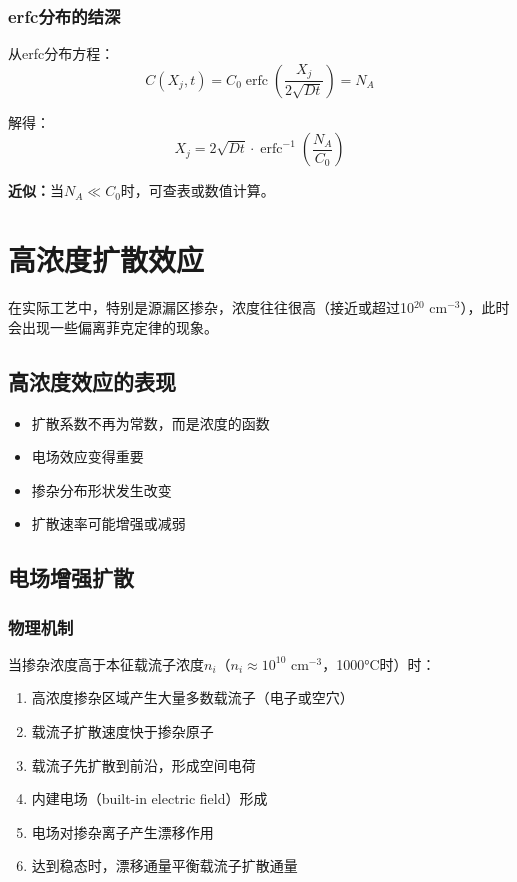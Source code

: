 \documentclass[UTF8,12pt,a4paper]{ctexart}
\begin{document}
\subsubsection{erfc分布的结深}

从erfc分布方程：
\begin{equation}
C(X_j,t) = C_0 \operatorname{erfc}\left(\frac{X_j}{2\sqrt{Dt}}\right) = N_A
\end{equation}

解得：
\begin{equation}
X_j = 2\sqrt{Dt} \cdot \operatorname{erfc}^{-1}\left(\frac{N_A}{C_0}\right)
\end{equation}

\textbf{近似：}当$N_A \ll C_0$时，可查表或数值计算。
\newpage
\section{高浓度扩散效应}

在实际工艺中，特别是源漏区掺杂，浓度往往很高（接近或超过10$^{20}$ cm$^{-3}$），此时会出现一些偏离菲克定律的现象。

\subsection{高浓度效应的表现}

\begin{itemize}
    \item 扩散系数不再为常数，而是浓度的函数
    \item 电场效应变得重要
    \item 掺杂分布形状发生改变
    \item 扩散速率可能增强或减弱
\end{itemize}

\subsection{电场增强扩散}

\subsubsection{物理机制}

当掺杂浓度高于本征载流子浓度$n_i$（$n_i \approx 10^{10}$ cm$^{-3}$，1000°C时）时：

\begin{enumerate}
    \item 高浓度掺杂区域产生大量多数载流子（电子或空穴）
    \item 载流子扩散速度快于掺杂原子
    \item 载流子先扩散到前沿，形成空间电荷
    \item 内建电场（built-in electric field）形成
    \item 电场对掺杂离子产生漂移作用
    \item 达到稳态时，漂移通量平衡载流子扩散通量
\end{enumerate}
\end{document}
